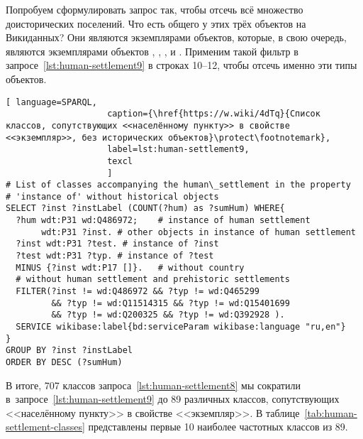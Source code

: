 Попробуем сформулировать запрос так, чтобы отсечь всё множество доисторических поселений.  
Что есть общего у этих трёх объектов на Викиданных? 
Они являются экземплярами объектов, которые, в свою очередь, 
являются экземплярами объектов , 
, 
, 
и . 
Применим такой фильтр в запросе~\ref{lst:human-settlement9} в строках 10--12, 
чтобы отсечь именно эти типы объектов.

\lstset{numbers=left, firstnumber=1, frame=single}
\begin{lstlisting}[ language=SPARQL, 
                    caption={\href{https://w.wiki/4dTq}{Cписок классов, сопутствующих <<населённому пункту>> в свойстве <<экземпляр>>, без исторических объектов}\protect\footnotemark},
                    label=lst:human-settlement9,
                    texcl 
                    ]
# List of classes accompanying the human\_settlement in the property
# 'instance of' without historical objects 
SELECT ?inst ?instLabel (COUNT(?hum) as ?sumHum) WHERE{
  ?hum wdt:P31 wd:Q486972;    # instance of human settlement
       wdt:P31 ?inst. # other objects in instance of human settlement
  ?inst wdt:P31 ?test. # instance of ?inst
  ?test wdt:P31 ?typ. # instance of ?test
  MINUS {?inst wdt:P17 []}.   # without country
  # without human settlement and prehistoric settlements
  FILTER(?inst != wd:Q486972 && ?typ != wd:Q465299 
         && ?typ != wd:Q11514315 && ?typ != wd:Q15401699 
         && ?typ != wd:Q200325 && ?typ != wd:Q392928 ). 
  SERVICE wikibase:label{bd:serviceParam wikibase:language "ru,en"}
}
GROUP BY ?inst ?instLabel
ORDER BY DESC (?sumHum)
\end{lstlisting}%

В итоге, 707 классов запроса~\ref{lst:human-settlement8} 
мы сократили в~запросе~\ref{lst:human-settlement9} 
до 89 различных классов, сопутствующих <<населённому пункту>> в свойстве <<экземпляр>>. 
В таблице~\ref{tab:human-settlement-classes} представлены первые 10 наиболее частотных классов из 89. 


